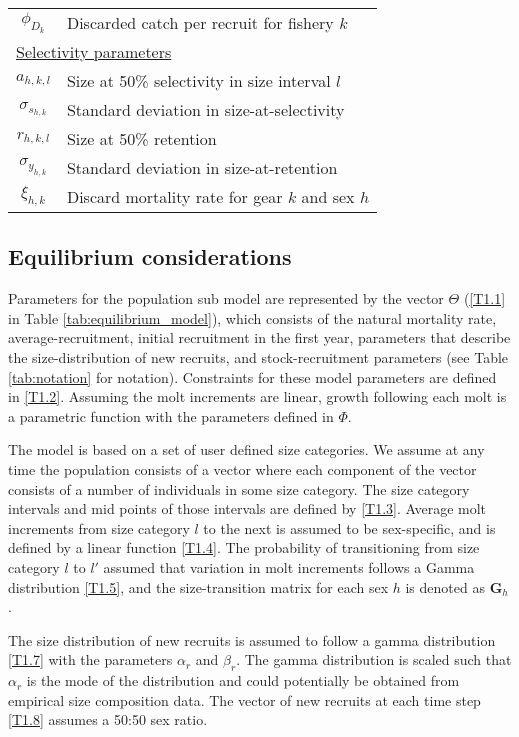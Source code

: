 \documentclass[12pt,letterpaper]{article}
\begin{document}
\begin{table}
\begin{tabular}{cl}
      $\phi_{D_k}$& Discarded catch per recruit for fishery $k$ \\
  \multicolumn{2}{l}{\underline{Selectivity parameters}} \\
      $a_{h,k,l}$ & Size at 50\% selectivity in size interval $l$\\
      $\sigma_{s_{h,k}}$ & Standard deviation in size-at-selectivity\\
      $r_{h,k,l}$ & Size at 50\% retention\\
      $\sigma_{y_{h,k}}$ & Standard deviation in size-at-retention\\
      $\xi_{h,k}$ & Discard mortality rate for gear $k$ and sex $h$\\
  \hline
  \end{tabular}
\end{table}


    \subsection*{Equilibrium considerations} %
    \label{sub:equilibrium_considerations}
    Parameters for the population sub model are represented by the vector $\Theta$ (\ref{T1.1} in Table \ref{tab:equilibrium_model}), which consists of the natural mortality rate, average-recruitment, initial recruitment in the first year, parameters that describe the size-distribution of new recruits, and stock-recruitment parameters (see Table \ref{tab:notation} for notation).  Constraints for these model parameters are defined in \eqref{T1.2}.  Assuming the molt increments are linear, growth following each molt is a parametric function with the parameters defined in $\Phi$.

    The model is based on a set of user defined size categories. We assume at any time the population consists of a vector where each component of the vector consists of a number of individuals in some size category. The size category intervals and mid points of those intervals are defined by \eqref{T1.3}.  Average molt increments from size category $l$ to the next is assumed to be sex-specific, and is defined by a linear function \eqref{T1.4}.  The probability of transitioning from  size category $l$ to $l'$ assumed that variation in molt increments follows a Gamma distribution \eqref{T1.5}, and the size-transition matrix for each sex $h$ is denoted as $\pmb{G}_h$.

    The size distribution of new recruits is assumed to follow a gamma distribution \eqref{T1.7} with the parameters $\alpha_r$ and $\beta_r$.  The gamma distribution is scaled such that $\alpha_r$ is the mode of the distribution and could potentially be obtained from empirical size composition data.  The vector of new recruits at each time step \eqref{T1.8} assumes a 50:50 sex ratio.
\end{document}
